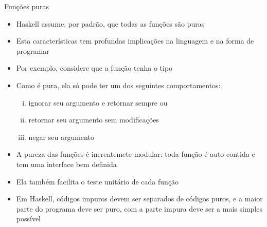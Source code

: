 \begin{frame}[fragile]{Funções puras}

    \begin{itemize}
        \item Haskell assume, por padrão, que todas as funções são puras

        \item Esta características tem profundas implicações na linguagem e na forma de programar

        \item Por exemplo, considere que a função  tenha o tipo

        \item Como  é pura, ela só pode ter um dos seguintes comportamentos:

        \begin{enumerate}[i.]
            \item ignorar seu argumento e retornar sempre  ou 

            \item retornar seu argumento sem modificações

            \item negar seu argumento
        \end{enumerate}

        \item A pureza das funções é inerentemete modular: toda função é auto-contida e tem uma
            interface bem definida

        \item Ela também facilita o teste unitário de cada função

        \item Em Haskell, códigos impuros devem ser separados de códigos puros, e a maior parte
            do programa deve ser puro, com a parte impura deve ser a mais simples possível
    \end{itemize}

\end{frame}
